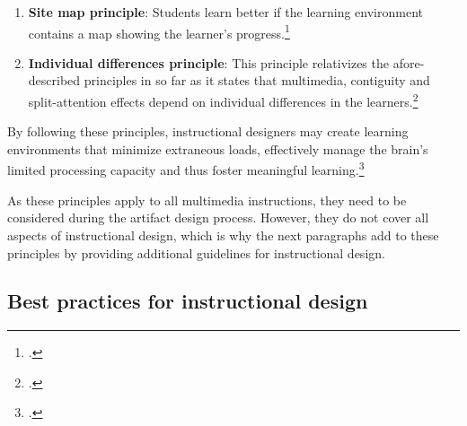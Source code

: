 \begin{enumerate}
    \item \textbf{Site map principle}: Students learn better if the learning environment contains a map showing the learner's progress.\footcites[Cf.][p.7]{MayerMultimediaLearning2009}
  \item \textbf{Individual differences principle}: This principle relativizes the afore-described principles in so far as it states that multimedia, contiguity and split-attention effects depend on individual differences in the learners.\footcites[Cf.][p.15]{MayerCognitiveTheoryMultimedia1999}
\end{enumerate}
By following these principles, instructional designers may create learning environments that minimize extraneous loads, effectively manage the brain's limited processing capacity and thus foster meaningful learning.\footcites[Cf.][chapter 2, paragraph 6]{ClarkElearningscienceinstruction2016}

As these principles apply to all multimedia instructions, they need to be considered during the artifact design process. However, they do not cover all aspects of instructional design, which is why the next paragraphs add to these principles by providing additional guidelines for instructional design.

\subsection{Best practices for instructional design} \label{subsec:BestPracticesDesign}

